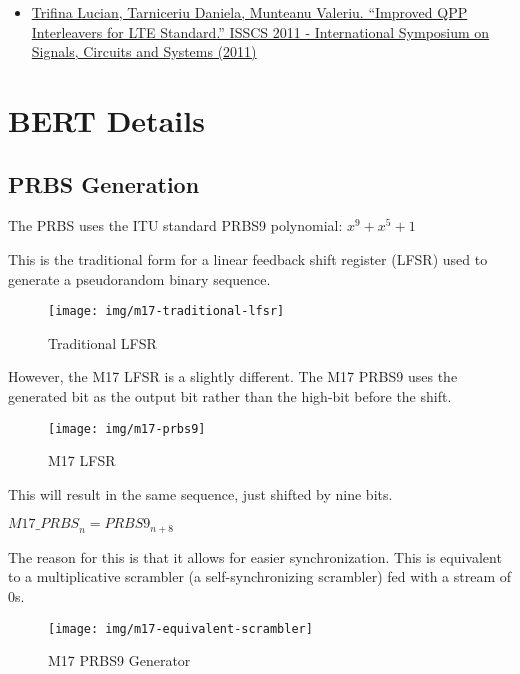 \documentclass[a4paper,11pt,oneside]{book}
\begin{document}
\begin{itemize}
	\item
	\href{https://arxiv.org/abs/1103.3794}{Trifina Lucian, Tarniceriu 	Daniela, Munteanu Valeriu. ``Improved QPP Interleavers for LTE 	Standard.'' ISSCS 2011 - International Symposium on Signals, Circuits 	and Systems (2011)}
\end{itemize}

\chapter{BERT Details} \label{bert_details}

\section{PRBS Generation}

The PRBS uses the ITU standard PRBS9 polynomial: $x^{9}+x^{5}+1$

This is the traditional form for a linear feedback shift register (LFSR)
used to generate a pseudorandom binary sequence.

\begin{figure}[H]
	\centering
	\texttt{[image: img/m17-traditional-lfsr]}
	\caption{Traditional LFSR}
	\label{fig:m17-traditional-lfsr}
\end{figure}

However, the M17 LFSR is a slightly different. The M17 PRBS9 uses the generated bit as the output bit rather than the high-bit before the shift.

\begin{figure}[H]
	\centering
	\texttt{[image: img/m17-prbs9]}
	\caption{M17 LFSR}
	\label{fig:m17-prbs9}
\end{figure}

This will result in the same sequence, just shifted by nine bits.

${M17\_PRBS}_{n} = {PRBS9}_{n + 8}$

The reason for this is that it allows for easier synchronization. This is equivalent to a multiplicative scrambler (a self-synchronizing scrambler) fed with a stream of 0s.

\begin{figure}[H]
	\centering
	\texttt{[image: img/m17-equivalent-scrambler]}
	\caption{M17 PRBS9 Generator}
	\label{fig:m17-equivalent-scrambler}
\end{figure}
\end{document}
